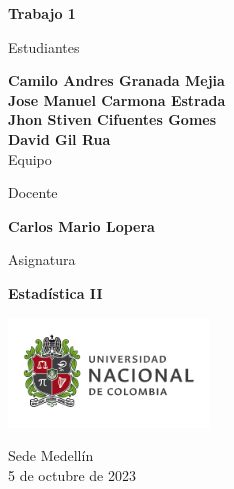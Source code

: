 \begin{titlepage}
   \Large{
   \begin{center}
       \vspace*{1cm}

       \textbf{Trabajo 1}

            
       \vspace{1.5cm}
       
       Estudiantes
       
       \vspace{0.5cm}
        
	\textbf{Camilo Andres Granada Mejia}\\    

  \textbf{Jose Manuel Carmona Estrada}\\

	\textbf{Jhon Stiven Cifuentes Gomes}\\

	\textbf{David Gil Rua}\\
	

              \vspace{1cm}
      Equipo 
       
       Docente
       
       \vspace{0.5cm}

       \textbf{Carlos Mario Lopera}
       
       \vspace{0.4cm}

       \vspace{1.4cm}
       
       Asignatura
       
       \vspace{0.5cm}

       \textbf{Estadística II}

       \vfill

            
     
       \includegraphics[width=0.4\textwidth]{logounal.png}
            
       Sede Medellín\\
       5 de octubre de 2023
       
   \end{center}
   }
\end{titlepage}